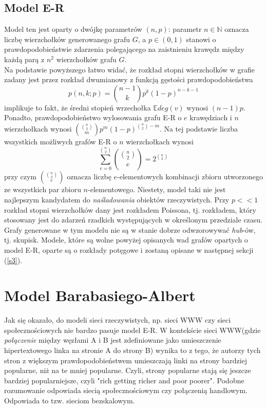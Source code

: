 \documentclass{article}
\begin{document}
\subsection{Model E-R}
	Model ten jest oparty o dwójkę parametrów $(n, p)$: parametr $n \in \mathbb{N}$ oznacza liczbę wierzchołków generowanego grafu $G$, a $p \in
	(0, 1)$ stanowi o prawdopodobieństwie zdarzenia polegającego na zaistnieniu krawędz między każdą parą z $n^2$ wierzchołków grafu $G$. \\
	Na podstawie powyższego łatwo widać, że rozkład stopni wierzchołków w grafie zadany jest przez rozkład dwumianowy z funkcją
	gęstości prawdopodobieństwa 
	\begin{equation}
		p(n,k; p) = \binom{n-1}{k}p^{k}(1-p)^{n-k - 1}
	\end{equation}
	implikuje to fakt, że średni stopień wrzechołka $\mathbb{E}deg(v)$ wynosi $(n-1)p$. Ponadto, prawdopodobieństwo wylosowania grafu E-R o $e$ krawędziach i $n$ wierzchołkach wynosi
	$\binom{\binom{n}{2}}{m}p^{m}(1-p)^{\binom{n}{2} - m}$. Na tej podstawie liczba wszystkich możliwych grafów E-R o $n$ wierzchołkach wynosi
	\begin{equation}
		\sum_{e = 0}^{\binom{n}{2}} \binom{\binom{n}{2}}{e} = 2^{\binom{n}{2}}
	\end{equation}
	przy czym $\binom{\binom{n}{2}}{e}$ oznacza liczbę $e$-elementowych kombinacji zbioru utworzonego ze wszystkich par zbioru $n$-elementowego. \newline
	Niestety, model taki nie jest najlepszym kandydatem do \textit{naśladowania} obiektów rzeczywistych. Przy $p << 1$ rozkład stopni wierzchołków dany jest rozkładem Poissona, tj. rozkładem, który stosowany jest do zdarzeń rzadkich występujących w określonym przedziale czasu. Grafy generowane w tym modelu nie są w stanie dobrze odwzorowywać \textit{hub}-ów, tj. skupisk. \newline
	Modele, które są wolne powyżej opisanych wad grafów opartych o model E-R, oparte są o rozkłady potęgowe i zostaną opisane w następnej sekcji (\ref{s3}).
\section{Model Barabasiego-Albert \label{s4}}
	Jak się okazało, do modeli sieci rzeczywistych, np. sieci WWW czy sieci społecznościowych nie bardzo pasuje model E-R. W kontekście sieci WWW(gdzie \textit{połączenie} między węzłami A i B jest zdefiniowane jako umieszczenie hipertextowego linka na stronie A do strony B) wynika to z tego, że autorzy tych stron z większym prawdopodobieństwem umieszczają linki na strony bardziej popularne, niż na te mniej popularne. Czyli, strony popularne stają się jeszcze bardziej popularniejsze, czyli "rich getting richer and poor poorer". Podobne rozumowanie odpowiada siecią społecznościowym czy połączenią handlowym. Odpowiada to tzw. sieciom bezskalowym.\cite{Fronczak2}
\end{document}
